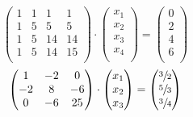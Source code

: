 \documentclass{report}
\begin{document}
        \begin{equation}
        \begin{pmatrix}
		  1 & 1 & 1 & 1 \\
		  1 & 5 & 5 & 5 \\
		  1 & 5 & 14 & 14 \\
		  1 & 5 & 14 & 15 \\
        \end{pmatrix}
        \cdot
        \begin{pmatrix}
          x_1 \\
          x_2 \\
          x_3 \\
          x_4 \\
        \end{pmatrix}
        =
        \begin{pmatrix}
          0 \\
          2 \\
          4 \\
          6 \\
        \end{pmatrix}
        \end{equation}
        \begin{equation}
        \begin{pmatrix}
		  1 & -2 & 0 \\
		  -2 & 8 & -6 \\
		  0 & -6 & 25 \\
        \end{pmatrix}
        \cdot
        \begin{pmatrix}
          x_1 \\
          x_2 \\
          x_3 \\
        \end{pmatrix}
        =
        \begin{pmatrix}
          \sfrac{3}{2} \\
          \sfrac{5}{3} \\
          \sfrac{3}{4} \\
        \end{pmatrix}
        \end{equation}
\end{document}
